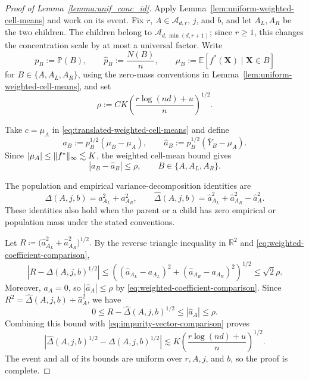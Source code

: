 \documentclass[11pt]{article}
\theoremstyle{plain}
\theoremstyle{definition}
\theoremstyle{remark}
\theoremstyle{plain}
\newcommand{\bX}{\mathbf{X}}
\DeclarePairedDelimiter{\norm}{\|}{\|}
\newcommand{\R}{\mathbb{R}}
\renewcommand{\P}{\mathbb{P}}
\newcommand{\E}{\mathbb{E}}
\newcommand{\1}{\mathbbm{1}}
\begin{document}
\begin{proof}[Proof of Lemma~\ref{lemma:unif_conc_id}]
Apply Lemma~\ref{lem:uniform-weighted-cell-means} and work on its event.
Fix $r$, $A\in\mathcal A_{d,r}$, $j$, and $b$, and let $A_L,A_R$ be
the two children. The children belong to
$\mathcal A_{d,\min(d,r+1)}$; since $r\ge1$, this changes the
concentration scale by at most a universal factor. Write
\[
p_B:=\P(B),\qquad \hat p_B:=\frac{N(B)}n,
\qquad \mu_B:=\E[f^*(\bX)\mid\bX\in B]
\]
for $B\in\{A,A_L,A_R\}$, using the zero-mass conventions in
Lemma~\ref{lem:uniform-weighted-cell-means}, and set
\[
\rho:=CK\left(\frac{r\log(nd)+u}{n}\right)^{1/2}.
\]

Take $c=\mu_A$ in \eqref{eq:translated-weighted-cell-means} and define
\[
a_B:=p_B^{1/2}(\mu_B-\mu_A),
\qquad
\hat a_B:=\hat p_B^{1/2}(\overline Y_B-\mu_A).
\]
Since $|\mu_A|\leq\norm{f^*}_\infty\lesssim K$, the weighted cell-mean
bound gives
\begin{equation}\label{eq:weighted-coefficient-comparison}
|a_B-\hat a_B|\leq\rho,
\qquad B\in\{A,A_L,A_R\}.
\end{equation}

The population and empirical variance-decomposition identities are
\begin{equation}\label{eq:three-cell-impurity-identities}
\Delta(A,j,b)=a_{A_L}^2+a_{A_R}^2,
\qquad
\widehat\Delta(A,j,b)
=\hat a_{A_L}^2+\hat a_{A_R}^2-\hat a_A^2.
\end{equation}
These identities also hold when the parent or a child has zero empirical
or population mass under the stated conventions.

Let $R\coloneqq\bigl(\hat a_{A_L}^2+\hat a_{A_R}^2\bigr)^{1/2}.$
By the reverse triangle inequality in $\R^2$ and
\eqref{eq:weighted-coefficient-comparison},
\begin{equation}\label{eq:impurity-vector-comparison}
\left|R-\Delta(A,j,b)^{1/2}\right|
\leq
\left((\hat a_{A_L}-a_{A_L})^2
+(\hat a_{A_R}-a_{A_R})^2\right)^{1/2}
\leq \sqrt{2}\rho.
\end{equation}
Moreover, $a_A=0$, so
$|\hat a_A|\leq\rho$ by
\eqref{eq:weighted-coefficient-comparison}. Since
$R^2=\widehat\Delta(A,j,b)+\hat a_A^2$, we have
\[
0\leq R-\widehat\Delta(A,j,b)^{1/2}
\leq |\hat a_A|
\leq\rho.
\]
Combining this bound with \eqref{eq:impurity-vector-comparison} proves
\[
\left|
\widehat\Delta(A,j,b)^{1/2}-\Delta(A,j,b)^{1/2}
\right|
\lesssim
K\left(\frac{r\log(nd)+u}{n}\right)^{1/2}.
\]
The event and all of its bounds are uniform over $r,A,j$, and $b$, so
the proof is complete.
\end{proof}
\end{document}
